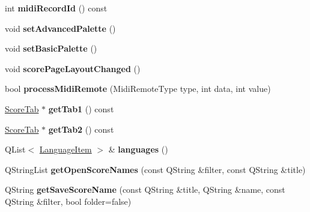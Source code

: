 \begin{DoxyCompactItemize}
int {\bfseries midi\+Record\+Id} () const
\item 
\mbox{\label{class_ms_1_1_muse_score_ad380c3d398fc452542b2d3f9e85b1948}} 
void {\bfseries set\+Advanced\+Palette} ()
\item 
\mbox{\label{class_ms_1_1_muse_score_a53bb4c06452c8394ecbd10e7eb733c69}} 
void {\bfseries set\+Basic\+Palette} ()
\item 
\mbox{\label{class_ms_1_1_muse_score_a06e4d50981882ed784430e2a7d986e9d}} 
void {\bfseries score\+Page\+Layout\+Changed} ()
\item 
\mbox{\label{class_ms_1_1_muse_score_a1d926ebb590e9a9d58972e1e9d255455}} 
bool {\bfseries process\+Midi\+Remote} (Midi\+Remote\+Type type, int data, int value)
\item 
\mbox{\label{class_ms_1_1_muse_score_a3cade38382132c18409226175556ca77}} 
\hyperlink{class_ms_1_1_score_tab}{Score\+Tab} $\ast$ {\bfseries get\+Tab1} () const
\item 
\mbox{\label{class_ms_1_1_muse_score_a9f7a27e6fccd8551c71186667c2eff75}} 
\hyperlink{class_ms_1_1_score_tab}{Score\+Tab} $\ast$ {\bfseries get\+Tab2} () const
\item 
\mbox{\label{class_ms_1_1_muse_score_abf04a7abb36349f5146eb07a288471ac}} 
Q\+List$<$ \hyperlink{struct_ms_1_1_language_item}{Language\+Item} $>$ \& {\bfseries languages} ()
\item 
\mbox{\label{class_ms_1_1_muse_score_abe2ed45904c7bc4ab19ceb76eed9f83c}} 
Q\+String\+List {\bfseries get\+Open\+Score\+Names} (const Q\+String \&filter, const Q\+String \&title)
\item 
\mbox{\label{class_ms_1_1_muse_score_a91cc75aa177aa047d93e9fa7c5d355c5}} 
Q\+String {\bfseries get\+Save\+Score\+Name} (const Q\+String \&title, Q\+String \&name, const Q\+String \&filter, bool folder=false)
\item 
\mbox{\label{class_ms_1_1_muse_score_a22bfa3bcbffde1293fac2710feb27700}} 

\end{DoxyCompactItemize}
